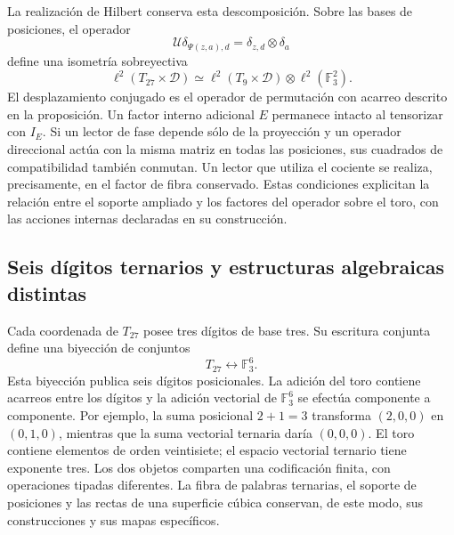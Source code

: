 La realización de Hilbert conserva esta descomposición. Sobre las bases
de posiciones, el operador
\[
 \mathcal U\delta_{\Psi(z,a),d}
       =\delta_{z,d}\otimes\delta_a
\]
define una isometría sobreyectiva
\[
 \ell^2(T_{27}\times\mathcal D)
 \simeq\ell^2(T_9\times\mathcal D)\otimes\ell^2(\mathbb F_3^2).
\]
El desplazamiento conjugado es el operador de permutación con acarreo
descrito en la proposición. Un factor interno adicional $E$ permanece
intacto al tensorizar con $I_E$. Si un lector de fase depende sólo de
la proyección y un operador direccional actúa con la misma matriz en
todas las posiciones, sus cuadrados de compatibilidad también
conmutan. Un lector que utiliza el cociente se realiza, precisamente,
en el factor de fibra conservado. Estas condiciones explicitan la
relación entre el soporte ampliado y los factores del operador sobre
el toro, con las acciones internas declaradas en su construcción.

\subsection{Seis dígitos ternarios y estructuras algebraicas distintas}

Cada coordenada de $T_{27}$ posee tres dígitos de base tres. Su escritura
conjunta define una biyección de conjuntos
\[
 T_{27}\longleftrightarrow\mathbb F_3^6.
\]
Esta biyección publica seis dígitos posicionales. La adición del toro
contiene acarreos entre los dígitos y la adición vectorial de
$\mathbb F_3^6$ se efectúa componente a componente. Por ejemplo, la
suma posicional $2+1=3$ transforma $(2,0,0)$ en $(0,1,0)$, mientras
que la suma vectorial ternaria daría $(0,0,0)$. El toro contiene
elementos de orden veintisiete; el espacio vectorial ternario tiene
exponente tres. Los dos objetos comparten una codificación finita,
con operaciones tipadas diferentes. La fibra de palabras ternarias,
el soporte de posiciones y las rectas de una superficie cúbica
conservan, de este modo, sus construcciones y sus mapas específicos.
